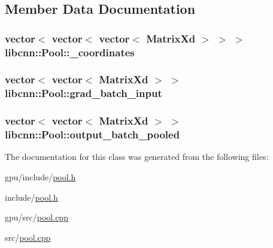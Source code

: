 \subsection{\-Member \-Data \-Documentation}
\hypertarget{classlibcnn_1_1_pool_a642547ee5b87d5aa1d0efa66323b8634}{
\subsubsection[{\-\_\-coordinates}]{\setlength{\rightskip}{0pt plus 5cm}vector$<$ vector$<$ vector$<$ \-Matrix\-Xd $>$ $>$ $>$ {\bf libcnn\-::\-Pool\-::\-\_\-coordinates}}}\label{classlibcnn_1_1_pool_a642547ee5b87d5aa1d0efa66323b8634}
\hypertarget{classlibcnn_1_1_pool_a8e645f991ecf5142723cdf468ff8e70d}{
\subsubsection[{grad\-\_\-batch\-\_\-input}]{\setlength{\rightskip}{0pt plus 5cm}vector$<$ vector$<$ \-Matrix\-Xd $>$ $>$ {\bf libcnn\-::\-Pool\-::grad\-\_\-batch\-\_\-input}}}\label{classlibcnn_1_1_pool_a8e645f991ecf5142723cdf468ff8e70d}
\hypertarget{classlibcnn_1_1_pool_a64cbcc583ad1bb2bac935aa3012b6370}{
\subsubsection[{output\-\_\-batch\-\_\-pooled}]{\setlength{\rightskip}{0pt plus 5cm}vector$<$ vector$<$ \-Matrix\-Xd $>$ $>$ {\bf libcnn\-::\-Pool\-::output\-\_\-batch\-\_\-pooled}}}\label{classlibcnn_1_1_pool_a64cbcc583ad1bb2bac935aa3012b6370}


\-The documentation for this class was generated from the following files\-:\begin{DoxyCompactItemize}
\item 
gpu/include/\hyperlink{gpu_2include_2pool_8h}{pool.\-h}\item 
include/\hyperlink{include_2pool_8h}{pool.\-h}\item 
gpu/src/\hyperlink{gpu_2src_2pool_8cpp}{pool.\-cpp}\item 
src/\hyperlink{src_2pool_8cpp}{pool.\-cpp}\end{DoxyCompactItemize}
